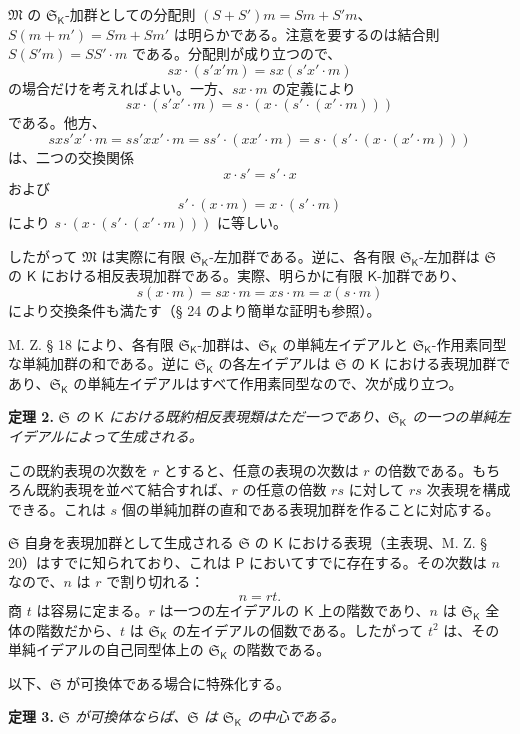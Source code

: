 $\mathfrak M$ の $\mathfrak S_{\mathsf K}$-加群としての分配則 $(S+S')m=Sm+S'm$、$S(m+m')=Sm+Sm'$ は明らかである。注意を要するのは結合則 $S(S'm)=SS'\cdot m$ である。分配則が成り立つので、
\[
sx\cdot(s'x' m)=sx(s'x'\cdot m)
\]
の場合だけを考えればよい。一方、$sx\cdot m$ の定義により
\[
sx\cdot(s'x'\cdot m)=s\cdot(x\cdot(s'\cdot(x'\cdot m)))
\]
である。他方、
\[
sx s'x'\cdot m=ss'xx'\cdot m=ss'\cdot(xx'\cdot m)
=s\cdot(s'\cdot(x\cdot(x'\cdot m)))
\]
は、二つの交換関係
\[
x\cdot s'=s'\cdot x
\]
および
\[
s'\cdot(x\cdot m)=x\cdot(s'\cdot m)
\]
により $s\cdot(x\cdot(s'\cdot(x'\cdot m)))$ に等しい。

したがって $\mathfrak M$ は実際に有限 $\mathfrak S_{\mathsf K}$-左加群である。逆に、各有限 $\mathfrak S_{\mathsf K}$-左加群は $\mathfrak S$ の $\mathsf K$ における相反表現加群である。実際、明らかに有限 $\mathsf K$-加群であり、
\[
s(x\cdot m)=sx\cdot m=xs\cdot m=x(s\cdot m)
\]
により交換条件も満たす（§ 24 のより簡単な証明も参照）。

M. Z. § 18 により、各有限 $\mathfrak S_{\mathsf K}$-加群は、$\mathfrak S_{\mathsf K}$ の単純左イデアルと $\mathfrak S_{\mathsf K}$-作用素同型な単純加群の和である。逆に $\mathfrak S_{\mathsf K}$ の各左イデアルは $\mathfrak S$ の $\mathsf K$ における表現加群であり、$\mathfrak S_{\mathsf K}$ の単純左イデアルはすべて作用素同型なので、次が成り立つ。

\textbf{定理 2.} \emph{$\mathfrak S$ の $\mathsf K$ における既約相反表現類はただ一つであり、$\mathfrak S_{\mathsf K}$ の一つの単純左イデアルによって生成される。}

この既約表現の次数を $r$ とすると、任意の表現の次数は $r$ の倍数である。もちろん既約表現を並べて結合すれば、$r$ の任意の倍数 $rs$ に対して $rs$ 次表現を構成できる。これは $s$ 個の単純加群の直和である表現加群を作ることに対応する。

$\mathfrak S$ 自身を表現加群として生成される $\mathfrak S$ の $\mathsf K$ における表現（主表現、M. Z. § 20）はすでに知られており、これは $\mathsf P$ においてすでに存在する。その次数は $n$ なので、$n$ は $r$ で割り切れる：
\[
n=rt.
\]
商 $t$ は容易に定まる。$r$ は一つの左イデアルの $\mathsf K$ 上の階数であり、$n$ は $\mathfrak S_{\mathsf K}$ 全体の階数だから、$t$ は $\mathfrak S_{\mathsf K}$ の左イデアルの個数である。したがって $t^2$ は、その単純イデアルの自己同型体上の $\mathfrak S_{\mathsf K}$ の階数である。

以下、$\mathfrak S$ が可換体である場合に特殊化する。

\textbf{定理 3.} \emph{$\mathfrak S$ が可換体ならば、$\mathfrak S$ は $\mathfrak S_{\mathsf K}$ の中心である。}

